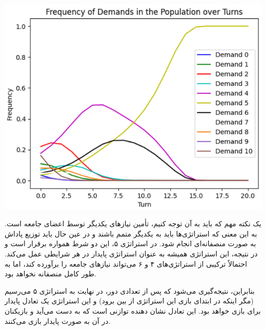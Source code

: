 \begin{center}
\includegraphics{20}
\end{center}

یک نکته مهم که باید به آن توجه کنیم، تأمین نیازهای یکدیگر توسط اعضای جامعه است. به این معنی که استراتژی‌ها باید به یکدیگر متمم باشند و در عین حال باید توزیع پاداش به صورت منصفانه‌ای انجام شود. در استراتژی ۵، این دو شرط همواره برقرار است و در نتیجه، این استراتژی همیشه به عنوان استراتژی پایدار در هر شرایطی عمل می‌کند. احتمالاً ترکیبی از استراتژی‌های ۴ و ۶ می‌تواند نیازهای جامعه را برآورده کند، اما به طور کامل منصفانه نخواهد بود.

بنابراین، نتیجه‌گیری می‌شود که پس از تعدادی دور، در نهایت به استراتژی ۵ می‌رسیم (مگر اینکه در ابتدای بازی این استراتژی از بین برود) و این استراتژی یک تعادل پایدار برای بازی خواهد بود. این تعادل نشان دهنده توازنی است که به دست می‌آید و بازیکنان در آن به صورت پایدار بازی می‌کنند.
